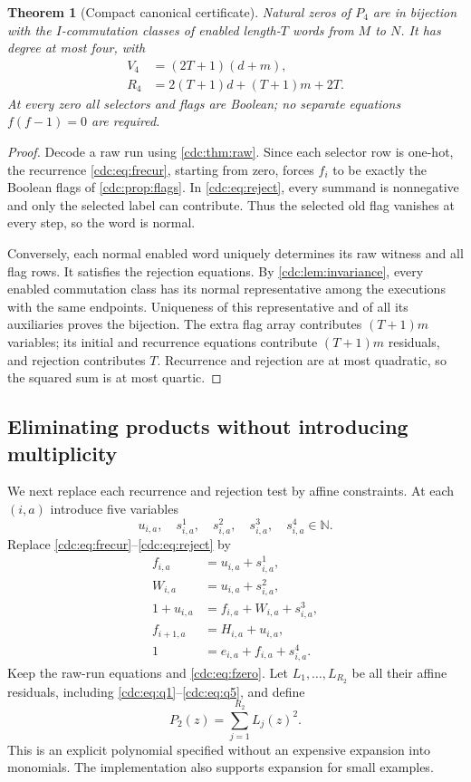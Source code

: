 \documentclass[11pt,a4paper]{article}
\newtheorem{theorem}{Theorem}[section]
\theoremstyle{definition}
\theoremstyle{remark}
\newcommand{\N}{\mathbb N}
\begin{document}
\begin{theorem}[Compact canonical certificate]\label{cdc:thm:quartic}
Natural zeros of $P_4$ are in bijection with the $I$-commutation classes of enabled length-$T$ words from $M$ to $N$. It has degree at most four, with
\begin{align}
V_4&=(2T+1)(d+m),\label{cdc:eq:V4}\\
R_4&=2(T+1)d+(T+1)m+2T.\label{cdc:eq:R4}
\end{align}
At every zero all selectors and flags are Boolean; no separate equations $f(f-1)=0$ are required.
\end{theorem}
\begin{proof}
Decode a raw run using \cref{cdc:thm:raw}. Since each selector row is one-hot, the recurrence \eqref{cdc:eq:frecur}, starting from zero, forces $f_i$ to be exactly the Boolean flags of \cref{cdc:prop:flags}. In \eqref{cdc:eq:reject}, every summand is nonnegative and only the selected label can contribute. Thus the selected old flag vanishes at every step, so the word is normal.

Conversely, each normal enabled word uniquely determines its raw witness and all flag rows. It satisfies the rejection equations. By \cref{cdc:lem:invariance}, every enabled commutation class has its normal representative among the executions with the same endpoints. Uniqueness of this representative and of all its auxiliaries proves the bijection. The extra flag array contributes $(T+1)m$ variables; its initial and recurrence equations contribute $(T+1)m$ residuals, and rejection contributes $T$. Recurrence and rejection are at most quadratic, so the squared sum is at most quartic.
\end{proof}

\subsection{Eliminating products without introducing multiplicity}
We next replace each recurrence and rejection test by affine constraints. At each $(i,a)$ introduce five variables
\[
u_{i,a},\quad s^1_{i,a},\quad s^2_{i,a},\quad
s^3_{i,a},\quad s^4_{i,a}\in\N.
\]
Replace \eqref{cdc:eq:frecur}--\eqref{cdc:eq:reject} by
\begin{align}
f_{i,a}&=u_{i,a}+s^1_{i,a},\label{cdc:eq:q1}\\
W_{i,a}&=u_{i,a}+s^2_{i,a},\label{cdc:eq:q2}\\
1+u_{i,a}&=f_{i,a}+W_{i,a}+s^3_{i,a},\label{cdc:eq:q3}\\
f_{i+1,a}&=H_{i,a}+u_{i,a},\label{cdc:eq:q4}\\
1&=e_{i,a}+f_{i,a}+s^4_{i,a}.\label{cdc:eq:q5}
\end{align}
Keep the raw-run equations and \eqref{cdc:eq:fzero}. Let $L_1,\ldots,L_{R_2}$ be all their affine residuals, including \eqref{cdc:eq:q1}--\eqref{cdc:eq:q5}, and define
\begin{equation}\label{cdc:eq:P2}
P_2(z)=\sum_{j=1}^{R_2}L_j(z)^2.
\end{equation}
This is an explicit polynomial specified without an expensive expansion into monomials. The implementation also supports expansion for small examples.
\end{document}
